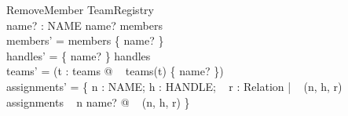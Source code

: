 \documentclass[a4paper,10pt,fleqn]{article}
\begin{document}
\begin{schema}{RemoveMember}
  \Delta TeamRegistry \\
  name? : NAME
\where
  name? \in members \\
  members' = members \setminus \{ name? \} \\
  handles' = \{ name? \} \ndres handles \\
  teams' = (\lambda t : \dom teams @
\quad~ teams(t) \setminus \{ name? \}) \\
  assignments' = \{ n : NAME; h : HANDLE;
\quad~ r : Relation |
\quad~ (n, h, r) \in assignments
\quad~ \land n \neq name? @
\quad~ (n, h, r) \}
\end{schema}
\end{document}
